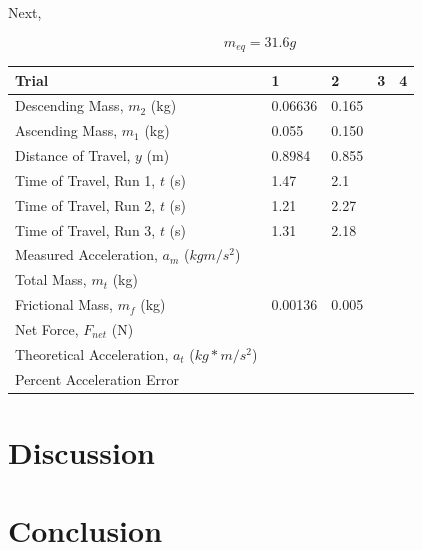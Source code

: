 \documentclass[11pt, titlepage]{article}
\begin{document}
Next, 

\begin{center}
$$m_{eq} = 31.6 g$$
\begin{tabular}
{|m{7em}|m{7em}|m{7em}|m{7em}|m{7em}|}
\hline
Trial & 1 & 2 & 3 & 4 \\
\hline
Descending Mass, $m_2$ (kg) & 0.06636 & 0.165 & & \\
\hline
Ascending Mass, $m_1$ (kg) & 0.055 & 0.150 & & \\
\hline
Distance of Travel, $y$ (m) & 0.8984 & 0.855 & & \\
\hline
Time of Travel, Run 1, $t$ (s) & 1.47 & 2.1 & & \\
\hline
Time of Travel, Run 2, $t$ (s) & 1.21 & 2.27 & & \\
\hline
Time of Travel, Run 3, $t$ (s) & 1.31 & 2.18 & & \\
\hline
Measured Acceleration, $a_m$ ($kgm/s^2$) & & & & \\
\hline
Total Mass, $m_t$ (kg) & & & & \\
\hline
Frictional Mass, $m_f$ (kg) & 0.00136 & 0.005 & & \\
\hline
Net Force, $F_{net}$ (N) & & & & \\ 
\hline
Theoretical Acceleration, $a_t$ ($kg*m/s^2$) & & & & \\
\hline
Percent Acceleration Error & & & & \\
\hline
\end{tabular}
\end{center}

\section*{Discussion}

\section*{Conclusion}
\end{document}
